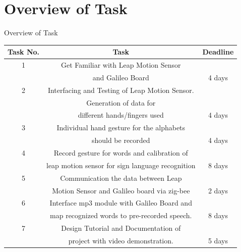 \documentclass[10pt, a4paper]{beamer}
\begin{document}
\section{Overview of Task}
\begin{frame}{Overview of Task}
\hspace{-21px}
\begin{tabular}{c|c|c}
    \hline
    Task No.&Task&Deadline\\
    \hline
    1&Get Familiar with Leap Motion Sensor&\\& and Galileo Board&4 days\\
    \hline
    2&Interfacing and Testing of Leap Motion Sensor.&\\
    &Generation of data for&\\& different hands/fingers used&4 days\\
    \hline
    3&Individual hand gesture for the alphabets &\\&should be recorded&4 days\\
    \hline
    4&Record gesture for words and calibration of &\\&leap motion sensor for sign language recognition&8 days\\
    \hline
    5&Communication the data between Leap  &\\&Motion Sensor and Galileo  board via zig-bee&2 days\\
    \hline
    6&Interface mp3 module with  Galileo Board and&\\& map recognized words to pre-recorded  speech.&8 days\\
    \hline
    7&Design Tutorial and Documentation of&\\& project with video demonstration.&5 days\\
\end{tabular}
\end{frame}
\end{document}
